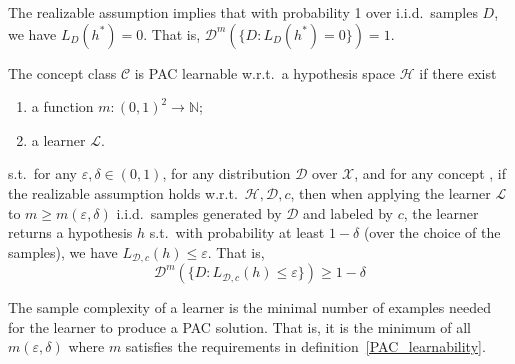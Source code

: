 \begin{re}
    The realizable assumption implies that with probability 1 over i.i.d.\ samples $D$, we have $L_D(h^*) = 0$.
    That is, $\mathcal{D}^m(\{D: L_D(h^*) = 0\}) = 1$.
\end{re}

\begin{df}\label{PAC_learnability}
    The concept class $\mathcal{C}$ is PAC learnable w.r.t.\ a hypothesis space $\mathcal{H}$ if there exist
    \begin{enumerate}
        \item a function $m: {(0, 1)}^2 \longrightarrow \mathbb{N}$;
        \item a learner $\mathcal{L}$.
    \end{enumerate}
    s.t.\ for any $\varepsilon, \delta \in (0, 1)$, for any distribution $\mathcal{D}$ over $\mathcal{X}$, and
    for any concept , if the realizable assumption holds w.r.t.\ $\mathcal{H}, \mathcal{D}, c$, then
    when applying the learner $\mathcal{L}$ to $m \geq m(\varepsilon, \delta)$ i.i.d.\ samples generated by
    $\mathcal{D}$ and labeled by $c$, the learner returns a hypothesis $h$ s.t.\ with probability at least 
    $1 - \delta$ (over the choice of the samples), we have $L_{\mathcal{D},c}(h) \leq \varepsilon$. That is,
    $$\mathcal{D}^m(\{D: L_{\mathcal{D},c}(h) \leq \varepsilon\}) \geq 1 - \delta$$
\end{df}

\begin{df}
    The sample complexity of a learn\-er is the minimal number of examples needed for the learner to produce a 
    PAC solution. That is, it is the minimum of all $m(\varepsilon, \delta)$ where $m$ satisfies the 
    requirements in definition~\ref{PAC_learnability}.
\end{df}


